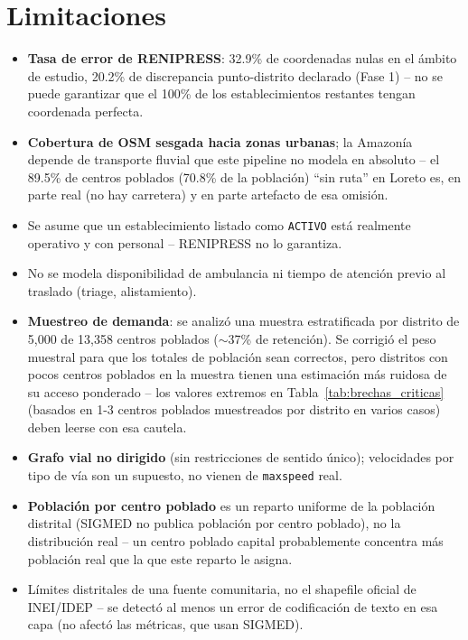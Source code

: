 \documentclass[11pt,a4paper]{article}
\begin{document}
\section{Limitaciones}
\begin{itemize}
  \item \textbf{Tasa de error de RENIPRESS}: 32.9\% de coordenadas nulas en
        el ámbito de estudio, 20.2\% de discrepancia punto-distrito
        declarado (Fase 1) -- no se puede garantizar que el 100\% de los
        establecimientos restantes tengan coordenada perfecta.
  \item \textbf{Cobertura de OSM sesgada hacia zonas urbanas}; la Amazonía
        depende de transporte fluvial que este pipeline no modela en
        absoluto -- el 89.5\% de centros poblados (70.8\% de la población)
        ``sin ruta'' en Loreto es, en parte real (no hay carretera) y en
        parte artefacto de esa omisión.
  \item Se asume que un establecimiento listado como \texttt{ACTIVO} está
        realmente operativo y con personal -- RENIPRESS no lo garantiza.
  \item No se modela disponibilidad de ambulancia ni tiempo de atención
        previo al traslado (triage, alistamiento).
  \item \textbf{Muestreo de demanda}: se analizó una muestra estratificada
        por distrito de 5,000 de 13,358 centros poblados ($\sim$37\% de
        retención). Se corrigió el peso muestral para que los totales de
        población sean correctos, pero distritos con pocos centros
        poblados en la muestra tienen una estimación más ruidosa de su
        acceso ponderado -- los valores extremos en
        Tabla~\ref{tab:brechas_criticas} (basados en 1-3 centros poblados
        muestreados por distrito en varios casos) deben leerse con esa
        cautela.
  \item \textbf{Grafo vial no dirigido} (sin restricciones de sentido
        único); velocidades por tipo de vía son un supuesto, no vienen de
        \texttt{maxspeed} real.
  \item \textbf{Población por centro poblado} es un reparto uniforme de la
        población distrital (SIGMED no publica población por centro
        poblado), no la distribución real -- un centro poblado capital
        probablemente concentra más población real que la que este reparto
        le asigna.
  \item Límites distritales de una fuente comunitaria, no el shapefile
        oficial de INEI/IDEP -- se detectó al menos un error de codificación
        de texto en esa capa (no afectó las métricas, que usan SIGMED).
\end{itemize}
\end{document}
